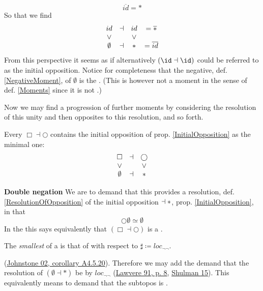 \begin{remark}
\begin{displaymath}
\overline{id} = \ast
\end{displaymath}
So that we find
\begin{displaymath}
\begin{matrix}
id &\dashv& id & = \overline{\ast}
\\
\vee && \vee
\\
\emptyset &\dashv& \ast & = \overline{id}
\end{matrix}
\end{displaymath}
From this perspective it seems as if alternatively $(\id \dashv \id)$ could be referred to as the initial opposition.
Notice for completeness that the negative, def. \ref{NegativeMoment}, of $\emptyset$ is the . (This is however not a moment in the sense of def. \ref{Moments} since it is not .)
\end{remark}
Now we may find a progression of further moments by considering the resolution of this unity and then opposites to this resolution, and so forth.
\begin{remark}
\label{}\hypertarget{}{}
Every    $\Box \dashv \bigcirc$ contains the initial opposition of prop. \ref{InitialOpposition} as the minimal one:
\begin{displaymath}
\begin{matrix}
\Box &\dashv& \bigcirc
\\
\vee && \vee
\\
\emptyset &\dashv& \ast
\end{matrix}
\end{displaymath}
\end{remark}
 \textbf{Double negation}
We are to demand that this provides a resolution, def. \ref{ResolutionOfOpposition} of the initial opposition $\empty \dashv \ast$, prop. \ref{InitialOpposition}, in that
\begin{displaymath}
\bigcirc \emptyset \simeq \emptyset
\end{displaymath}
In the  this says equivalently that $(\Box \dashv \bigcirc)$ is a .
\begin{defn}
\label{InitialOpposition}\hypertarget{InitialOpposition}{}
The \emph{smallest}  of a  is that of  with respect to  $\sharp \coloneqq loc_{\neg \neg}$.
\end{defn}
(\hyperlink{Johnstone02}{Johnstone 02, corollary A4.5.20}).
Therefore we may add the demand that the resolution of $(\emptyset \dashv \ast)$ be by $loc_{\neg \neg}$ (\hyperlink{Lawvere91}{Lawvere 91, p. 8}, \href{}{Shulman 15}). This equivalently means to demand that the  subtopos is  .
